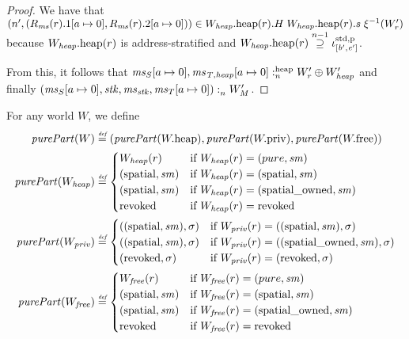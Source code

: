 \documentclass[a4paper]{article}
\begin{document}
\begin{proof}
  We have that $\npair[n']{(R_\ms(r).1\update{a}{0},R_\ms(r).2\update{a}{0})} \in \pwheap[W_\var{heap}](r).H \;
  \pwheap[W_\var{heap}](r).s \; \xi^{-1}(W_r')$ because $\pwheap[W_\var{heap}](r)$ is address-stratified and $\pwheap[W_\var{heap}](r) \nsupeq[n-1] \stdreg{[\baddr',\eaddr']}{\pur}$.

  From this, it follows that $\memSatHeap{\ms_S\update{a}{0},\ms_\var{T,heap}\update{a}{0}}{W_r' \oplus W_\var{heap}'}$ and finally $\memSat{(\ms_S\update{a}{0},\stk,\ms_\stk,\ms_T\update{a}{0})}{W_M'}$.
\end{proof}

\begin{definition}[purePart]
  For any world $W$, we define
  \begin{align*}
    \purePart{W} &\defeq (\purePart{\pwheap},\purePart{\pwpriv},\purePart{\pwfree})\\
    \purePart{W_\var{heap}} &\defeq
                       \begin{cases}
                         W_{\var{heap}}(r) & \text{if } W_\var{heap}(r) = (pure,\var{sm})\\
                         (\spatial,\var{sm}) & \text{if } W_\var{heap}(r) = (\spatial,\var{sm})\\
                         (\spatial,\var{sm}) & \text{if } W_\var{heap}(r) = (\spatialo,\var{sm})\\
                         \revoked & \text{if } W_\var{heap}(r) = \revoked\\
                       \end{cases}\\
    \purePart{W_\var{priv}} &\defeq
                       \begin{cases}
                         ((\spatial,\var{sm}),\sigma) & \text{if } W_\var{priv}(r) = ((\spatial,\var{sm}),\sigma)\\
                         ((\spatial,\var{sm}),\sigma) & \text{if } W_\var{priv}(r) = ((\spatialo,\var{sm}),\sigma)\\
                         (\revoked,\sigma) & \text{if } W_\var{priv}(r) = (\revoked,\sigma)\\
                       \end{cases}\\
    \purePart{W_\var{free}} &\defeq
                       \begin{cases}
                         W_{\var{free}}(r) & \text{if } W_{\var{free}}(r) = (pure,\var{sm})\\
                         (\spatial,\var{sm}) & \text{if } W_{\var{free}}(r) = (\spatial,\var{sm})\\
                         (\spatial,\var{sm}) & \text{if } W_{\var{free}}(r) = (\spatialo,\var{sm})\\
                         \revoked & \text{if } W_{\var{free}}(r) = \revoked\\
                       \end{cases}
  \end{align*}
\end{definition}
\end{document}
